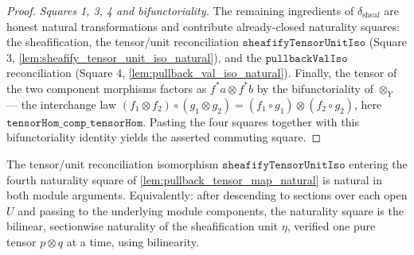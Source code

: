 \begin{proof}
  \emph{Squares 1, 3, 4 and bifunctoriality.} The remaining ingredients of
  \(\delta_{\mathrm{sheaf}}\) are honest natural transformations and contribute already-closed
  naturality squares: the sheafification, the tensor/unit reconciliation
  \(\mathtt{sheafifyTensorUnitIso}\) (Square 3, \cref{lem:sheafify_tensor_unit_iso_natural}),
  and the \(\mathtt{pullbackValIso}\) reconciliation (Square 4,
  \cref{lem:pullback_val_iso_natural}). Finally, the tensor of the two component morphisms
  factors as \(f^*a \otimes f^*b\) by the bifunctoriality of \(\otimes_Y\) --- the interchange
  law \((f_1 \otimes f_2) \circ (g_1 \otimes g_2) = (f_1 \circ g_1) \otimes (f_2 \circ g_2)\),
  here \(\mathtt{tensorHom\_comp\_tensorHom}\). Pasting the four squares together with this
  bifunctoriality identity yields the asserted commuting square.
\end{proof}

\begin{lemma}\leanok
  \label{lem:sheafify_tensor_unit_iso_natural}
  The tensor/unit reconciliation isomorphism \(\mathtt{sheafifyTensorUnitIso}\) entering the
  fourth naturality square of \cref{lem:pullback_tensor_map_natural} is natural in both
  module arguments. Equivalently: after descending to sections over each open \(U\) and
  passing to the underlying module components, the naturality square is the
  bilinear, sectionwise naturality of the sheafification unit \(\eta\), verified one pure
  tensor \(p \otimes q\) at a time, using bilinearity.
\end{lemma}


